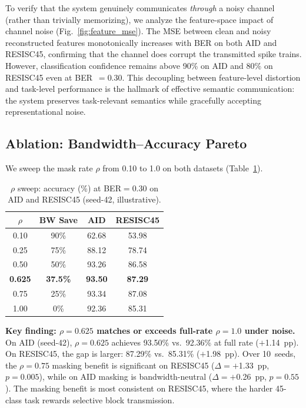 \documentclass[conference]{IEEEtran}
\begin{document}
To verify that the system genuinely communicates \emph{through} a noisy channel (rather than trivially memorizing), we analyze the feature-space impact of channel noise (Fig.~\ref{fig:feature_mse}). The MSE between clean and noisy reconstructed features monotonically increases with BER on both AID and RESISC45, confirming that the channel does corrupt the transmitted spike trains. However, classification confidence remains above 90\% on AID and 80\% on RESISC45 even at BER~$= 0.30$. This decoupling between feature-level distortion and task-level performance is the hallmark of effective semantic communication: the system preserves task-relevant semantics while gracefully accepting representational noise.



\subsection{Ablation: Bandwidth--Accuracy Pareto}

We sweep the mask rate $\rho$ from 0.10 to 1.0 on both datasets (Table~\ref{tab:rho_ablation}).

\begin{table}[t]
\renewcommand{\arraystretch}{1.15}
\centering
\caption{$\rho$ sweep: accuracy (\%) at BER$=$0.30 on AID and RESISC45 (seed-42, illustrative).}
\label{tab:rho_ablation}
\begin{tabular}{c c cc}
\toprule
$\rho$ & \textbf{BW Save} & \textbf{AID} & \textbf{RESISC45} \\
\midrule
0.10 & 90\% & 62.68 & 53.98 \\
0.25 & 75\% & 88.12 & 78.74 \\
0.50 & 50\% & 93.26 & 86.58 \\
\textbf{0.625} & \textbf{37.5\%} & \textbf{93.50} & \textbf{87.29} \\
0.75 & 25\% & 93.34 & 87.08 \\
1.00 & 0\% & 92.36 & 85.31 \\
\bottomrule
\end{tabular}
\end{table}

\textbf{Key finding: $\rho{=}0.625$ matches or exceeds full-rate $\rho{=}1.0$ under noise.} On AID (seed-42), $\rho{=}0.625$ achieves 93.50\% vs.\ 92.36\% at full rate ($+$1.14~pp). On RESISC45, the gap is larger: 87.29\% vs.\ 85.31\% ($+$1.98~pp). Over 10~seeds, the $\rho{=}0.75$ masking benefit is significant on RESISC45 ($\Delta{=}+$1.33~pp, $p{=}0.005$), while on AID masking is bandwidth-neutral ($\Delta{=}+$0.26~pp, $p{=}0.55$). The masking benefit is most consistent on RESISC45, where the harder 45-class task rewards selective block transmission.
\end{document}

